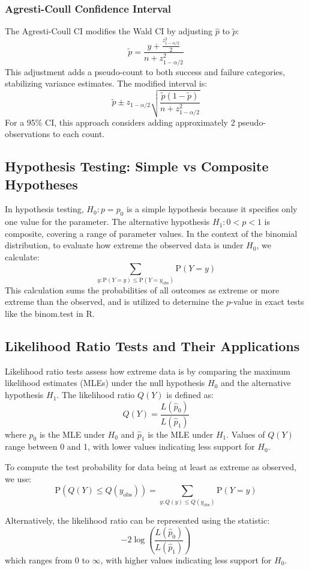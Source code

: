 \documentclass{article}
\begin{document}
\subsubsection{Agresti-Coull Confidence Interval}
The Agresti-Coull CI modifies the Wald CI by adjusting $\hat{p}$ to $\tilde{p}$:
\[
\tilde{p} = \frac{y + \frac{z_{1-\alpha/2}^2}{2}}{n + z_{1-\alpha/2}^2}
\]
This adjustment adds a pseudo-count to both success and failure categories, stabilizing variance estimates. The modified interval is:
\[
\tilde{p} \pm z_{1-\alpha/2} \sqrt{\frac{\tilde{p}(1 - \tilde{p})}{n + z_{1-\alpha/2}^2}}
\]
For a 95\% CI, this approach considers adding approximately 2 pseudo-observations to each count.

\subsection{Hypothesis Testing: Simple vs Composite Hypotheses}
In hypothesis testing, $H_0: p = p_0$ is a simple hypothesis because it specifies only one value for the parameter. The alternative hypothesis $H_1: 0 < p < 1$ is composite, covering a range of parameter values. In the context of the binomial distribution, to evaluate how extreme the observed data is under $H_0$, we calculate:
\[
\sum_{y: \mathrm{P}(Y=y) \leq \mathrm{P}(Y=y_{\text{obs}})} \mathrm{P}(Y=y)
\]
This calculation sums the probabilities of all outcomes as extreme or more extreme than the observed, and is utilized to determine the $p$-value in exact tests like the binom.test in R.

\subsection{Likelihood Ratio Tests and Their Applications}
Likelihood ratio tests assess how extreme data is by comparing the maximum likelihood estimates (MLEs) under the null hypothesis $H_0$ and the alternative hypothesis $H_1$. The likelihood ratio $Q(Y)$ is defined as:
\[
Q(Y) = \frac{L(\hat{p}_{0})}{L(\hat{p}_{1})}
\]
where $\hat{p}_{0}$ is the MLE under $H_0$ and $\hat{p}_{1}$ is the MLE under $H_1$. Values of $Q(Y)$ range between 0 and 1, with lower values indicating less support for $H_0$.

To compute the test probability for data being at least as extreme as observed, we use:
\[
\mathrm{P}\left(Q(Y) \leq Q(y_{\text{obs}})\right) = \sum_{y: Q(y) \leq Q(y_{\text{obs}})} \mathrm{P}(Y=y)
\]

Alternatively, the likelihood ratio can be represented using the statistic:
\[
-2 \log \left(\frac{L(\hat{p}_{0})}{L(\hat{p}_{1})}\right)
\]
which ranges from 0 to $\infty$, with higher values indicating less support for $H_0$.
\end{document}
